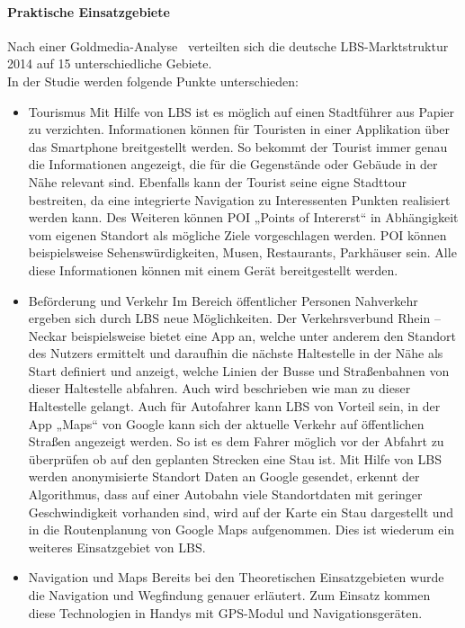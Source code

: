 \paragraph{Praktische Einsatzgebiete}
Nach einer Goldmedia-Analyse~\cite[S.9]{goldmedia:lbs} verteilten sich die deutsche LBS-Marktstruktur 2014 auf 15 unterschiedliche Gebiete.\\
In der Studie werden folgende Punkte unterschieden:
\begin{itemize}
	\item Tourismus
	Mit Hilfe von LBS ist es möglich auf einen Stadtführer aus Papier zu verzichten. Informationen können für Touristen in einer Applikation über das Smartphone breitgestellt werden. So bekommt der Tourist immer genau die Informationen angezeigt, die für die Gegenstände oder Gebäude in der Nähe relevant sind. Ebenfalls kann der Tourist seine eigne Stadttour bestreiten, da eine integrierte Navigation zu Interessenten Punkten realisiert werden kann. Des Weiteren können POI „Points of Intererst“ in Abhängigkeit vom eigenen Standort als mögliche Ziele vorgeschlagen werden. POI können beispielsweise Sehenswürdigkeiten, Musen, Restaurants, Parkhäuser sein.
Alle diese Informationen können mit einem Gerät bereitgestellt werden.

	\item Beförderung und Verkehr
	Im Bereich öffentlicher Personen Nahverkehr ergeben sich durch LBS neue Möglichkeiten. Der Verkehrsverbund Rhein –Neckar beispielsweise bietet eine App an, welche unter anderem den Standort des Nutzers ermittelt und daraufhin die nächste Haltestelle in der Nähe als Start definiert und anzeigt, welche Linien der Busse und Straßenbahnen von dieser Haltestelle abfahren. Auch wird beschrieben wie man zu dieser Haltestelle gelangt.
Auch für Autofahrer kann LBS von Vorteil sein, in der App „Maps“ von Google kann sich der aktuelle Verkehr auf öffentlichen Straßen angezeigt werden. So ist es dem Fahrer möglich vor der Abfahrt zu überprüfen ob auf den geplanten Strecken eine Stau ist. Mit Hilfe von LBS werden anonymisierte Standort Daten an Google gesendet, erkennt der Algorithmus, dass auf einer Autobahn viele Standortdaten mit geringer Geschwindigkeit vorhanden sind, wird auf der Karte ein Stau dargestellt und in die Routenplanung von Google Maps aufgenommen. Dies ist wiederum ein weiteres Einsatzgebiet von LBS. 

	
	\item Navigation und Maps
	Bereits bei den Theoretischen Einsatzgebieten wurde die Navigation und Wegfindung genauer erläutert. Zum Einsatz kommen diese Technologien in Handys mit GPS-Modul und Navigationsgeräten. 
	

\end{itemize}
